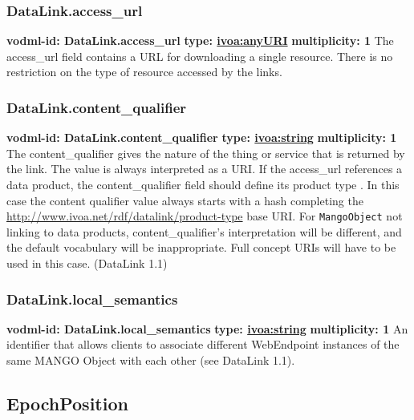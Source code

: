     \subsubsection{DataLink.access\_url}
      \textbf{vodml-id: DataLink.access\_url} \newline
      \textbf{type: \hyperref[sect:ivoa]{ivoa:anyURI}} \newline
      \textbf{multiplicity: 1} \newline 
      The access\_url field contains a URL for downloading a single resource. There is no restriction on the type of resource accessed by the links.

    \subsubsection{DataLink.content\_qualifier}
      \textbf{vodml-id: DataLink.content\_qualifier} \newline
      \textbf{type: \hyperref[sect:ivoa]{ivoa:string}} \newline
      \textbf{multiplicity: 1} \newline 
      The content\_qualifier gives the nature of the thing or service that is returned by the link. The value is always interpreted as a URI. If the access\_url references a data product, the content\_qualifier field should define its product type . In this case the content qualifier value always starts with a hash completing the \url{http://www.ivoa.net/rdf/datalink/product-type} base URI. For \texttt{MangoObject} not linking to data products, content\_qualifier’s interpretation will be different, and the default vocabulary will be inappropriate. Full concept URIs will have to be used in this case. (DataLink 1.1)

    \subsubsection{DataLink.local\_semantics}
      \textbf{vodml-id: DataLink.local\_semantics} \newline
      \textbf{type: \hyperref[sect:ivoa]{ivoa:string}} \newline
      \textbf{multiplicity: 1} \newline 
      An identifier that allows clients to associate different WebEndpoint instances of the same MANGO Object with each other (see DataLink 1.1).

  \subsection{EpochPosition}

